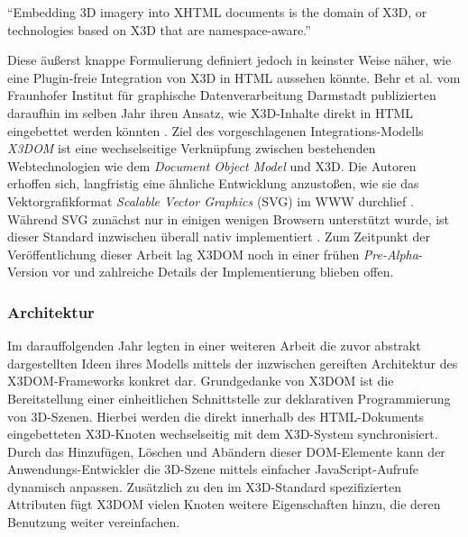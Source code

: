 \begin{itquote}
	\enquote{Embedding 3D imagery into XHTML documents is the domain of X3D, or technologies based on X3D that are namespace-aware.} \autocite{W3C_HTML5_SPEC_WORKING_DRAFT_12_2009}
\end{itquote}

Diese äußerst knappe Formulierung definiert jedoch in keinster Weise näher, wie eine Plugin-freie Integration von X3D in HTML aussehen könnte. Behr et al. vom Fraunhofer Institut für graphische Datenverarbeitung Darmstadt publizierten daraufhin im selben Jahr ihren Ansatz, wie X3D-Inhalte direkt in HTML eingebettet werden könnten \autocite{Behr:2009:XDH:1559764.1559784}. Ziel des vorgeschlagenen Integrations-Modells \emph{X3DOM} ist eine wechselseitige Verknüpfung zwischen bestehenden Webtechnologien wie dem \emph{Document Object Model} und X3D. Die Autoren erhoffen sich, langfristig eine ähnliche Entwicklung anzustoßen, wie sie das Vektorgrafikformat \emph{Scalable Vector Graphics} (SVG) im WWW durchlief \autocite{Behr:2009:XDH:1559764.1559784}. Während SVG zunächst nur in einigen wenigen Browsern unterstützt wurde, ist dieser Standard inzwischen überall nativ implementiert \autocite{CANIUSE_SVG}. Zum Zeitpunkt der Veröffentlichung dieser Arbeit lag X3DOM noch in einer frühen \emph{Pre-Alpha}-Version vor und zahlreiche Details der Implementierung blieben offen.

\subsubsection{Architektur}
\label{SEC:X3D_ARCHITECTURE}

Im darauffolgenden Jahr legten \textcite{Behr:2010:SAH:1836049.1836077} in einer weiteren Arbeit die zuvor abstrakt dargestellten Ideen ihres Modells mittels der inzwischen gereiften Architektur des X3DOM-Frameworks konkret dar. Grundgedanke von X3DOM ist die Bereitstellung einer einheitlichen Schnittstelle zur deklarativen Programmierung von 3D-Szenen. Hierbei werden die direkt innerhalb des HTML-Dokuments eingebetteten X3D-Knoten wechselseitig mit dem X3D-System synchronisiert. Durch das Hinzufügen, Löschen und Abändern dieser DOM-Elemente kann der Anwendungs-Entwickler die 3D-Szene mittels einfacher JavaScript-Aufrufe dynamisch anpassen.
Zusätzlich zu den im X3D-Standard spezifizierten Attributen fügt X3DOM vielen Knoten weitere Eigenschaften hinzu, die deren Benutzung weiter vereinfachen.

